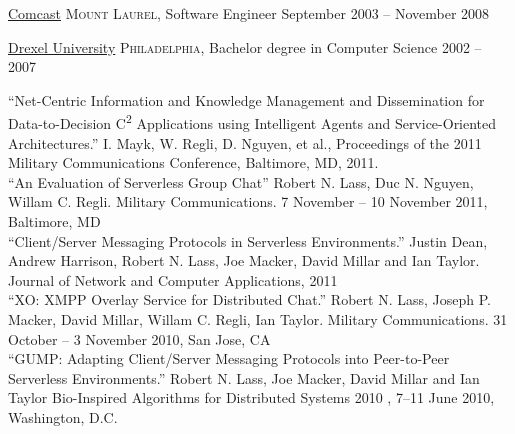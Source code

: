 \documentclass[10pt,a4paper]{article}
\begin{document}
\headedsection
  {\href{http://www.comcast.com/}{Comcast}}
  {\textsc{Mount Laurel, }} {%
  \headedsubsection
    {Software Engineer}
    {September 2003 -- November 2008}
    {}
}

\vspace{0.5em}
\spacedhrule{0.5em}{-0.4em}

\headedsection
  {\href{http://www.drexel.edu}{Drexel University}}
  {\textsc{Philadelphia, }} {%
  \headedsubsection
  {Bachelor degree in Computer Science}
  {2002 -- 2007}
  {}
}
\spacedhrule{0.5em}{-0.4em}



\vspace{0.3em}

\noindent ``Net-Centric Information and Knowledge Management and Dissemination for Data-to-Decision C\textsuperscript{2} Applications using Intelligent Agents and Service-Oriented Architectures.'' I. Mayk, W. Regli, D. Nguyen, et al.,  Proceedings of the 2011 Military Communications Conference, Baltimore, MD, 2011. \\

\noindent ``An Evaluation of Serverless Group Chat'' Robert N. Lass, Duc N. Nguyen,  Willam C. Regli. Military Communications. 7 November -- 10 November 2011, Baltimore, MD \\

\noindent ``Client/Server Messaging Protocols in Serverless Environments.'' Justin Dean, Andrew Harrison, Robert N. Lass, Joe Macker, David Millar and Ian Taylor. Journal of Network and Computer Applications, 2011 \\

\noindent ``XO: XMPP Overlay Service for Distributed Chat.'' Robert N. Lass, Joseph P. Macker, David Millar, Willam C. Regli, Ian Taylor. Military Communications. 31 October -- 3 November 2010, San Jose, CA \\

\noindent ``GUMP: Adapting Client/Server Messaging Protocols into Peer-to-Peer Serverless Environments.'' Robert N. Lass, Joe Macker, David Millar and Ian Taylor Bio-Inspired Algorithms for Distributed Systems 2010 , 7--11 June 2010, Washington, D.C. \\
\end{document}
